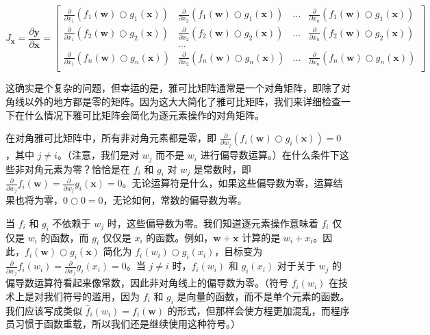 \documentclass{ctexart}
\begin{document}
\[J_\mathbf{x} = 
\frac{\partial \mathbf{y}}{\partial \mathbf{x}}  = \begin{bmatrix}
\frac{\partial}{\partial x_1} ( f_{1}(\mathbf{w}) \bigcirc g_{1}(\mathbf{x}) ) & \frac{\partial}{\partial x_2} ( f_{1}(\mathbf{w}) \bigcirc g_{1}(\mathbf{x}) ) & \ldots & \frac{\partial}{\partial x_n} ( f_{1}(\mathbf{w}) \bigcirc g_{1}(\mathbf{x}) )\\
\frac{\partial}{\partial x_1} ( f_{2}(\mathbf{w}) \bigcirc g_{2}(\mathbf{x}) ) & \frac{\partial}{\partial x_2} ( f_{2}(\mathbf{w}) \bigcirc g_{2}(\mathbf{x}) ) & \ldots & \frac{\partial}{\partial x_n} ( f_{2}(\mathbf{w}) \bigcirc g_{2}(\mathbf{x}) )\\
& \ldots\\
\frac{\partial}{\partial x_1} ( f_{n}(\mathbf{w}) \bigcirc g_{n}(\mathbf{x}) ) & \frac{\partial}{\partial x_2} ( f_{n}(\mathbf{w}) \bigcirc g_{n}(\mathbf{x}) ) & \ldots & \frac{\partial}{\partial x_n} ( f_{n}(\mathbf{w}) \bigcirc g_{n}(\mathbf{x}) )\\
\end{bmatrix}\]

这确实是个复杂的问题，但幸运的是，雅可比矩阵通常是一个对角矩阵，即除了对角线以外的地方都是零的矩阵。因为这大大简化了雅可比矩阵，我们来详细检查一下在什么情况下雅可比矩阵会简化为逐元素操作的对角矩阵。

在对角雅可比矩阵中，所有非对角元素都是零，即 $\frac{\partial}{\partial w_j} ( f_i(\mathbf{w}) \bigcirc g_i(\mathbf{x}) ) = 0$，其中 $j \neq i$。（注意，我们是对 $w_j$ 而不是 $w_i$ 进行偏导数运算。）在什么条件下这些非对角元素为零？恰恰是在 $f_i$ 和 $g_i$ 对 $w_j$ 是常数时，即 $\frac{\partial}{\partial w_j} f_i(\mathbf{w}) = \frac{\partial}{\partial w_j} g_i(\mathbf{x}) = 0$。无论运算符是什么，如果这些偏导数为零，运算结果也将为零，$0 \bigcirc 0 = 0$，无论如何，常数的偏导数为零。

当 $f_i$ 和 $g_i$ 不依赖于 $w_j$ 时，这些偏导数为零。我们知道逐元素操作意味着 $f_i$ 仅仅是 $w_i$ 的函数，而 $g_i$ 仅仅是 $x_i$ 的函数。例如，$\mathbf{w}+\mathbf{x}$ 计算的是 $w_i + x_i$。因此，$f_i(\mathbf{w}) \bigcirc g_i(\mathbf{x})$ 简化为 $f_i(w_i) \bigcirc g_i(x_i)$，目标变为 $\frac{\partial}{\partial w_j} f_i(w_i) = \frac{\partial}{\partial w_j} g_i(x_i) = 0$。当 $j \neq i$ 时，$f_i(w_i)$ 和 $g_i(x_i)$ 对于关于 $w_j$ 的偏导数运算符看起来像常数，因此非对角线上的偏导数为零。（符号 $f_i(w_i)$ 在技术上是对我们符号的滥用，因为 $f_i$ 和 $g_i$ 是向量的函数，而不是单个元素的函数。我们应该写成类似 $\hat f_{i}(w_i) = f_{i}(\mathbf{w})$ 的形式，但那样会使方程更加混乱，而程序员习惯于函数重载，所以我们还是继续使用这种符号。）
\end{document}
